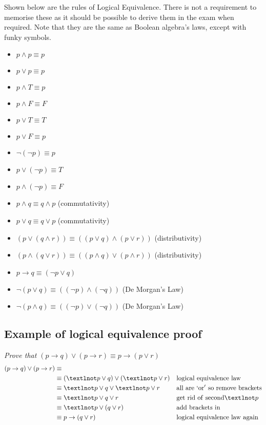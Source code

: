 Shown below are the rules of Logical Equivalence. There is not a requirement to memorise these as it should be possible to derive them in the exam when required. Note that they are the same as Boolean algebra's laws, except with funky symbols.
\begin{itemize}
    \item $p \wedge p \equiv p$
    \item $p \vee p \equiv p$
    \item $p \wedge T \equiv p$
    \item $p \wedge F \equiv F$
    \item $p \vee T \equiv T$
    \item $p \vee F \equiv p$
    \item $¬(¬p) \equiv p$
    \item $p \vee (¬p) \equiv T$
    \item $p \wedge (¬p) \equiv F$
    \item $p \wedge q \equiv q \wedge p$ (commutativity)
    \item $p \vee q \equiv q \vee p$ (commutativity)
    \item $(p \vee (q \wedge r)) \equiv ((p \vee q) \wedge (p \vee r))$ (distributivity)
    \item $(p \wedge (q \vee r)) \equiv ((p \wedge q) \vee (p \wedge r))$ (distributivity)
    \item $p \rightarrow q \equiv (¬p \vee q)$
    \item $¬(p \vee q) \equiv ((¬p)\wedge(¬q))$ (De Morgan's Law)
    \item $¬(p \wedge q) \equiv ((¬p)\vee(¬q))$ (De Morgan's Law)
\end{itemize}

\subsection{Example of logical equivalence proof}
\textit{Prove that $(p\rightarrow q) \vee (p \rightarrow r) \equiv p \rightarrow (p \vee r)$}
\begin{align*}
    (p\rightarrow q) \vee (p \rightarrow r) &\equiv  &&\\
    & \equiv (¬p \vee q) \vee (¬p \vee r) && \mathrm{logical\ equivalence\ law}\\
    & \equiv ¬p \vee q \vee ¬p \vee r && \mathrm{all\ are\ `or'\ so\ remove\ brackets}\\
    & \equiv ¬p \vee q \vee r && \mathrm{get\ rid\ of\ second} ¬p\\
    & \equiv ¬p \vee (q \vee r)&& \mathrm{add\ brackets\ in} \\
    & \equiv p \rightarrow (q \vee r) && \mathrm{logical\ equivalence\ law\ again}
\end{align*}

